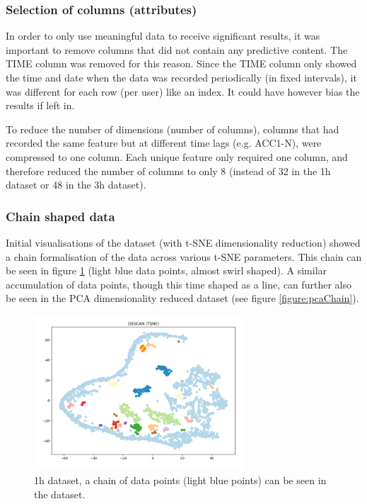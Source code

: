 \subsubsection{Selection of columns (attributes)}
In order to only use meaningful data to receive significant results, it was important to remove columns that did not contain any predictive content. The TIME column was removed for this reason. Since the TIME column only showed the time and date when the data was recorded periodically (in fixed intervals), it was different for each row (per user) like an index. It could have however bias the results if left in. 

To reduce the number of dimensions (number of columns), columns that had recorded the same feature but at different time lags (e.g. ACC1-N), were compressed to one column. Each unique feature only required one column, and therefore reduced the number of columns to only 8 (instead of 32 in the 1h dataset or 48 in the 3h dataset).


\subsubsection{Chain shaped data}
\label{section:chainShapedData}
Initial visualisations of the dataset (with t-SNE dimensionality reduction) showed a chain formalisation of the data across various t-SNE parameters. This chain can be seen in figure \ref{figure:tsneChain} (light blue data points, almost swirl shaped). A similar accumulation of data points, though this time shaped as a line, can further also be seen in the PCA dimensionality reduced dataset (see figure \ref{figure:pcaChain}). 


\begin{figure}[h]
  \centering
  \includegraphics[width=0.7\textwidth]{./images/tsneChain.png}
  \caption{1h dataset, a chain of data points (light blue points) can be seen in the dataset.}
  \label{figure:tsneChain}
\end{figure}



